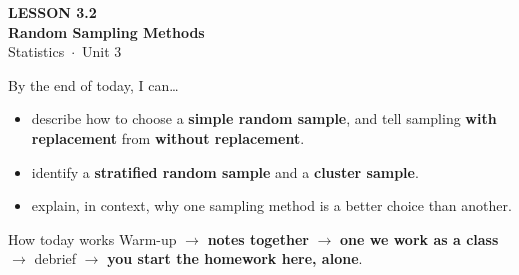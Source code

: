 \documentclass[aspectratio=169, 11pt]{beamer}
\begin{document}
{
\begin{frame}[plain]
  \vspace{2.8cm}\hspace{0.55cm}%
  \begin{minipage}{0.9\textwidth}
    {\color{goldacc}\bfseries\small LESSON 3.2}\\[0.5cm]
    {\color{white}\bfseries\LARGE Random Sampling Methods}\\[1.2cm]
    {\color{skymid}\small Statistics~$\cdot$~Unit 3}
  \end{minipage}
\end{frame}
}

\newcommand{\redink}[1]{{\color{redacc}\bfseries #1}}

\begin{frame}[t, plain]
  By the end of today, I can\ldots
  \begin{itemize}\setlength{\itemsep}{5pt}
    \item describe how to choose a \textbf{simple random sample}, and tell sampling
          \textbf{with replacement} from \textbf{without replacement}.
    \item identify a \textbf{stratified random sample} and a \textbf{cluster sample}.
    \item explain, in context, why one sampling method is a better choice than another.
  \end{itemize}
  \begin{block}{How today works}
    Warm-up $\to$ \textbf{notes together} $\to$ \textbf{one we work as a class} $\to$
    debrief $\to$ \textbf{you start the homework here, alone}.
  \end{block}
\end{frame}
\end{document}
